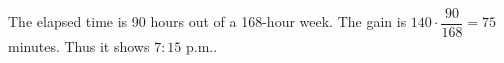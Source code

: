 The elapsed time is 90 hours out of a 168-hour week. The gain is $140\cdot\dfrac{90}{168}=75$ minutes. Thus it shows $\boxed{7{:}15\text{ p.m.}}$.
